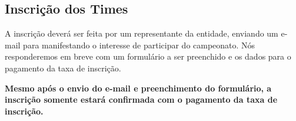 \subsection{Inscrição dos Times}

A inscrição deverá ser feita por um representante da entidade, enviando um e-mail para  manifestando o interesse de participar do campeonato. Nós responderemos em breve com um formulário a ser preenchido e os dados para o pagamento da taxa de inscrição.


\textbf{Mesmo após o envio do e-mail e preenchimento do formulário, a inscrição somente estará confirmada com o pagamento da taxa de inscrição.}
